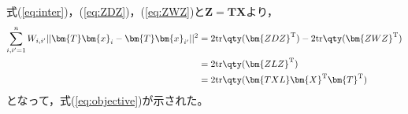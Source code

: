\documentclass[class=jsarticle, crop=false, dvipdfmx, fleqn]{standalone}
\begin{document}
式(\ref{eq:inter})，(\ref{eq:ZDZ})，(\ref{eq:ZWZ})と\(\bm{Z} = \bm{TX}\)より，
\begin{align}
    \sum_{i, i' = 1}^{n} W_{i, i'} ||\bm{T} \bm{x}_i - \bm{T} \bm{x}_{i'}||^2
        & = 2\mathrm{tr}\qty(\bm{ZDZ}^\mathrm{T}) - 2\mathrm{tr}\qty(\bm{ZWZ}^\mathrm{T}) \\
        & = 2\mathrm{tr}\qty(\bm{ZLZ}^\mathrm{T}) \\
        & = 2 \mathrm{tr}\qty(\bm{TXL}\bm{X}^\mathrm{T} \bm{T}^\mathrm{T})
\end{align}
となって，式(\ref{eq:objective})が示された。
\end{document}
